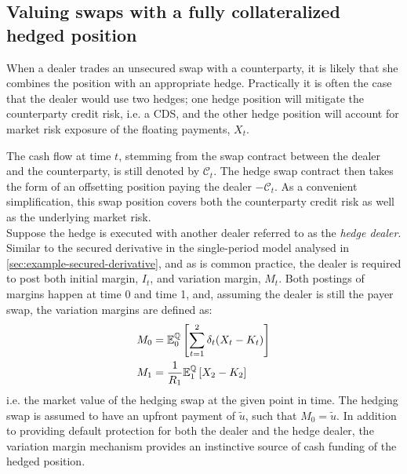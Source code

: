 \documentclass[main.tex]{subfiles}
\begin{document}
    \subsection{Valuing swaps with a fully collateralized hedged position}
        When a dealer trades an unsecured swap with a counterparty,
        it is likely that she combines the position with an appropriate hedge.
        Practically it is often the case that the dealer would use two hedges; one hedge position will mitigate the counterparty credit risk, i.e. a CDS, and the other hedge position will account for market risk exposure of the floating payments, $X_t$.
        
        The cash flow at time $t$, stemming from the swap contract between the dealer and the counterparty,
        is still denoted by $\mathcal{C}_t$.
        The hedge swap contract then takes the form of an offsetting position paying the dealer $-\mathcal{C}_t$.
        As a convenient simplification, this swap position covers both the counterparty credit risk as well as the underlying market risk.
        \\
        Suppose the hedge is executed with another dealer referred to as the \textit{hedge dealer}.
        Similar to the secured derivative in the single-period model analysed in \cref{sec:example-secured-derivative},
        and as is common practice,
        the dealer is required to post both initial margin, $I_{t}$, and variation margin, $M_{t}$.
        Both postings of margins happen at time 0 and time 1,
        and, assuming the dealer is still the payer swap,
        the variation margins are defined as:
        \begin{align}
            M_0 &= \mathbb{E}_{0}^{\mathbb{Q}}\left[\sum_{t=1}^{2}\delta_t (X_t - K_t)\right]
            \\
            M_1 &= \frac{1}{R_1}\mathbb{E}_{1}^{\mathbb{Q}}\left[X_2 - K_2\right] 
        \end{align}
        i.e. the market value of the hedging swap at the given point in time.
        The hedging swap is assumed to have an upfront payment of $\tilde{u}$, such that $M_0 = \tilde{u}$.
        In addition to providing default protection for both the dealer and the hedge dealer,
        the variation margin mechanism provides an instinctive source of cash funding of the hedged position. 
\end{document}

